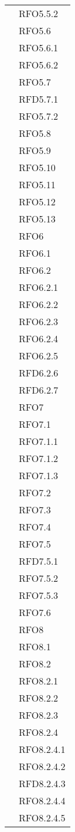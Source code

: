 \begin{longtable}{ p{12cm} | p{4cm} }
	& RFO5.5.2 \\
	& RFO5.6 \\
	& RFO5.6.1 \\
	& RFO5.6.2 \\
	& RFO5.7 \\
	& RFD5.7.1 \\
	& RFO5.7.2 \\
	& RFO5.8 \\
	& RFO5.9 \\
	& RFO5.10 \\
	& RFO5.11 \\
	& RFO5.12 \\
	& RFO5.13 \\
	& RFO6 \\
	& RFO6.1 \\
	& RFO6.2 \\
	& RFO6.2.1 \\
	& RFO6.2.2 \\
	& RFO6.2.3 \\
	& RFO6.2.4 \\
	& RFO6.2.5 \\
	& RFD6.2.6 \\
	& RFD6.2.7 \\
	& RFO7 \\
	& RFO7.1 \\
	& RFO7.1.1 \\
	& RFO7.1.2 \\
	& RFO7.1.3 \\
	& RFO7.2 \\
	& RFO7.3 \\
	& RFO7.4 \\
	& RFO7.5 \\
	& RFD7.5.1 \\
	& RFO7.5.2 \\
	& RFO7.5.3 \\
	& RFO7.6 \\
	& RFO8 \\
	& RFO8.1 \\
	& RFO8.2 \\
	& RFO8.2.1 \\
	& RFO8.2.2 \\
	& RFO8.2.3 \\
	& RFO8.2.4 \\
	& RFO8.2.4.1 \\
	& RFO8.2.4.2 \\
	& RFD8.2.4.3 \\
	& RFO8.2.4.4 \\
	& RFO8.2.4.5 \\

\end{longtable}
